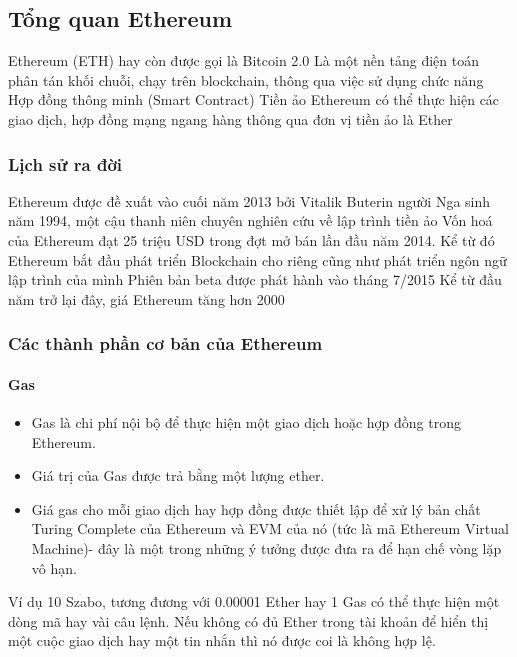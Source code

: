 \documentclass[12pt]{article}
\begin{document}
		\subsection{Tổng quan Ethereum}
		Ethereum (ETH) hay còn được gọi là Bitcoin 2.0 \newline
		\indent Là một nền tảng điện toán phân tán khối chuỗi, chạy trên blockchain, thông qua việc sử dụng chức năng Hợp đồng thông minh (Smart Contract) \newline
		\indent Tiền ảo Ethereum có thể thực hiện các giao dịch, hợp đồng mạng ngang hàng thông qua đơn vị tiền ảo là Ether
		\subsubsection{Lịch sử ra đời}
		Ethereum được đề xuất vào cuối năm 2013 bởi Vitalik Buterin người Nga sinh năm 1994, một cậu thanh niên chuyên nghiên cứu về lập trình tiền ảo\newline
		\indent Vốn hoá của Ethereum đạt 25 triệu USD trong đợt mở bán lần đầu năm 2014. Kể từ đó Ethereum bắt đầu phát triển Blockchain cho riêng cũng như phát triển ngôn ngữ lập trình của mình \newline
		\indent Phiên bản beta được phát hành vào tháng 7/2015 \newline
		\indent Kể từ đầu năm trở lại đây, giá Ethereum tăng hơn 2000%
		
		\subsubsection{Các thành phần cơ bản của Ethereum}
		\paragraph{Gas}
		\begin{itemize}
			\item Gas là chi phí nội bộ để thực hiện một giao dịch hoặc hợp đồng trong Ethereum. 
			\item Giá trị của Gas được trả bằng một lượng ether.
			\item Giá gas cho mỗi giao dịch hay hợp đồng được thiết lập để xử lý bản chất Turing Complete của Ethereum và EVM của nó (tức là mã Ethereum Virtual Machine)- đây là một trong những ý tưởng được đưa ra để hạn chế vòng lặp vô hạn.
		\end{itemize}
		\indent Ví dụ 10 Szabo, tương đương với 0.00001 Ether hay 1 Gas có thể thực hiện một dòng mã hay vài câu lệnh. Nếu không có đủ Ether trong tài khoản để hiển thị một cuộc giao dịch hay một tin nhắn thì nó được coi là không hợp lệ.
		
\end{document}
